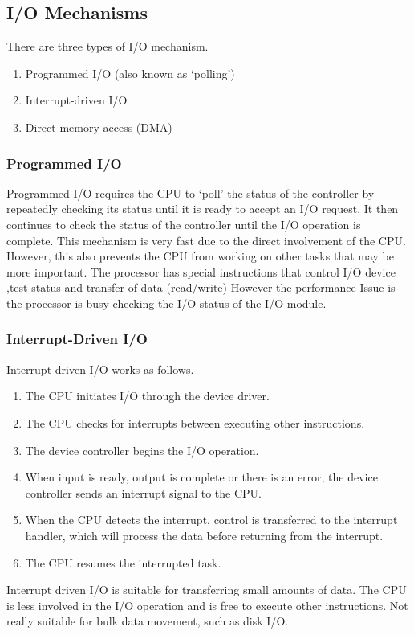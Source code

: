 \subsection{I/O Mechanisms}
There are three types of I/O mechanism.
\begin{enumerate}
  \item Programmed I/O (also known as `polling')
  \item Interrupt-driven I/O
  \item Direct memory access (DMA)
\end{enumerate}
\subsubsection{Programmed I/O}

Programmed I/O requires the CPU to `poll' the status of the controller by repeatedly checking its status until it is ready to accept an I/O request.
It then continues to check the status of the controller until the I/O operation is complete.
\newline
This mechanism is very fast due to the direct involvement of the CPU\@.
However, this also prevents the CPU from working on other tasks that may be more important.
\newline
The processor has special instructions that control I/O device ,test status and transfer of data (read/write)
However the performance Issue is the processor is busy checking the I/O status of the I/O module.
\subsubsection{Interrupt-Driven I/O}

Interrupt driven I/O works as follows.
\begin{enumerate}
  \item The CPU initiates I/O through the device driver.
  \item The CPU checks for interrupts between executing other instructions.
  \item The device controller begins the I/O operation.
  \item When input is ready, output is complete or there is an error, the device controller sends an interrupt signal to the CPU.
  \item When the CPU detects the interrupt, control is transferred to the interrupt handler, which will process the data before returning from the interrupt.
  \item The CPU resumes the interrupted task.
\end{enumerate}
Interrupt driven I/O is suitable for transferring small amounts of data.
The CPU is less involved in the I/O operation and is free to execute other instructions.
Not really suitable for bulk data movement, such as disk I/O.

